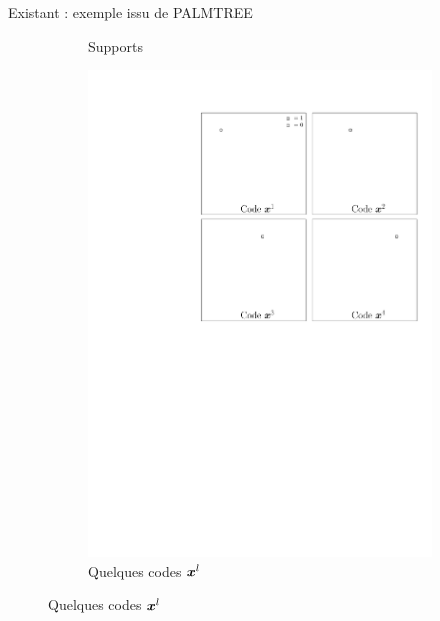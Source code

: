 \begin{frame}{Existant : exemple issu de PALMTREE}
\begin{figure}[!ht]
\begin{subfigure}[b]{0.30\textwidth}
		\caption{Supports}
\end{subfigure}
\begin{subfigure}[b]{0.30\textwidth}\centering
	\includegraphics[width=\textwidth]{figures-masters-thesis/tree-learn-setup/codes.pdf}
	\caption{Quelques codes $\bm{x}^l$}
\end{subfigure}
\end{figure}
\end{frame}


